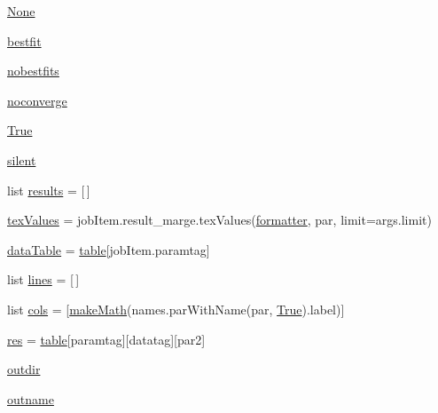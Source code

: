 \begin{DoxyCompactItemize}
\mbox{\hyperlink{namespacemakeParamCompare_aaaf4240769f1d81ceaee225fb2cc7ff9}{None}}
\item 
\mbox{\hyperlink{namespacemakeParamCompare_a78c73d45296e5d4bfa4e7ccc508a0f1e}{bestfit}}
\item 
\mbox{\hyperlink{namespacemakeParamCompare_aeb43cff8d3c742a4d0793be0e39c4e0d}{nobestfits}}
\item 
\mbox{\hyperlink{namespacemakeParamCompare_a2ff167b8253390f3468243c0f5cdee55}{noconverge}}
\item 
\mbox{\hyperlink{namespacemakeParamCompare_aabddf04b32ac6fb88ad21c814a6d8c8e}{True}}
\item 
\mbox{\hyperlink{namespacemakeParamCompare_ab5471b382b84567c8785d447e67d6b38}{silent}}
\item 
list \mbox{\hyperlink{namespacemakeParamCompare_a63bd7fa0335b8e89483825026f8beb18}{results}} = \mbox{[}$\,$\mbox{]}
\item 
\mbox{\hyperlink{namespacemakeParamCompare_a14a1fc637bcf194755ffca25251ad76a}{tex\+Values}} = job\+Item.\+result\+\_\+marge.\+tex\+Values(\mbox{\hyperlink{namespacemakeParamCompare_a3e755bc2f3d4d73bfd8a68ab1ee09b90}{formatter}}, par, limit=args.\+limit)
\item 
\mbox{\hyperlink{namespacemakeParamCompare_ad05d9a18446b37f2a71947b3c60c2ec5}{data\+Table}} = \mbox{\hyperlink{namespacemakeParamCompare_a0aaa9db629ff499211c8f1c14411e01c}{table}}\mbox{[}job\+Item.\+paramtag\mbox{]}
\item 
list \mbox{\hyperlink{namespacemakeParamCompare_a3216035f3a8c7491a5a72acb32cb4692}{lines}} = \mbox{[}$\,$\mbox{]}
\item 
list \mbox{\hyperlink{namespacemakeParamCompare_a51c26937d26c5056b6b3d96027921a40}{cols}} = \mbox{[}\mbox{\hyperlink{namespacemakeParamCompare_a0ba50ebae7e2f64b2c0b7c2565ce9164}{make\+Math}}(names.\+par\+With\+Name(par, \mbox{\hyperlink{namespacemakeParamCompare_aabddf04b32ac6fb88ad21c814a6d8c8e}{True}}).label)\mbox{]}
\item 
\mbox{\hyperlink{namespacemakeParamCompare_a1e933d56b51e207bd423ff0edb57b0cb}{res}} = \mbox{\hyperlink{namespacemakeParamCompare_a0aaa9db629ff499211c8f1c14411e01c}{table}}\mbox{[}paramtag\mbox{]}\mbox{[}datatag\mbox{]}\mbox{[}par2\mbox{]}
\item 
\mbox{\hyperlink{namespacemakeParamCompare_aac9df2320fdd009bb27d3e80611fcf25}{outdir}}
\item 
\mbox{\hyperlink{namespacemakeParamCompare_af1963b39a9026d5b237af938f4aaa73d}{outname}}
\end{DoxyCompactItemize}


